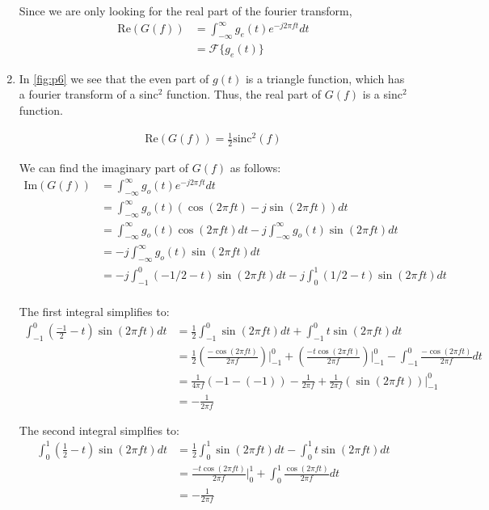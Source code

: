 \documentclass{article}
\begin{document}
\begin{enumerate}[label=6.\arabic*]
    Since we are only looking for the real part of the fourier transform,
    \begin{align*}
        \text{Re}(G(f)) &= \int_{-\infty}^{\infty} g_e(t)e^{-j2\pi ft} dt \\
        &= \mathcal{F}\{g_e(t)\}
    \end{align*}

    \item In \autoref{fig:p6} we see that the even part of $g(t)$ is a triangle function, which has a fourier transform of a sinc$^2$ function. Thus, the real part of $G(f)$ is a sinc$^2$ function.

    \begin{align*}
        \text{Re}(G(f)) = \frac{1}{2}\text{sinc}^2(f)
    \end{align*}

    We can find the imaginary part of $G(f)$ as follows:
    \begin{align*}
        \text{Im}(G(f)) &= \int_{-\infty}^{\infty} g_o(t)e^{-j2\pi ft} dt \\
        &= \int_{-\infty}^{\infty} g_o(t)(\cos(2\pi ft) - j\sin(2\pi ft)) dt \\
        &= \int_{-\infty}^{\infty} g_o(t)\cos(2\pi ft) dt - j\int_{-\infty}^{\infty} g_o(t)\sin(2\pi ft) dt \\
        &= -j \int_{-\infty}^{\infty} g_o(t)\sin(2\pi ft) dt \\
        &= -j \int_{-1}^{0}(-1/2 - t)\sin(2\pi ft) dt - j \int_{0}^{1}(1/2 - t)\sin(2\pi ft) dt \\
    \end{align*}

    The first integral simplifies to:
    \begin{align*}
        \int_{-1}^{0}\left(\frac{-1}{2} -t\right)\sin(2\pi f t) dt &= \frac{1}{2}\int_{-1}^{0}\sin(2\pi f t) dt + \int_{-1}^{0}t\sin(2\pi f t) dt \\
        &= \frac{1}{2}\left(\frac{-\cos(2\pi f t)}{2\pi f}\right)\Bigg|_{-1}^{0} + \left(\frac{-t\cos(2\pi f t)}{2\pi f}\right)\Bigg|_{-1}^{0} - \int_{-1}^{0}\frac{-\cos(2\pi f t)}{2\pi f} dt \\
        &= \frac{1}{4\pi f} \left(-1 - (-1)\right) - \frac{1}{2\pi f} + \frac{1}{2\pi f} \left(\sin(2\pi f t )\right)\Bigg|_{-1}^{0} \\
        &= -\frac{1}{2\pi f}
    \end{align*}

    The second integral simplfies to:
    \begin{align*}
        \int_{0}^{1}\left(\frac{1}{2} -t\right)\sin(2\pi f t) dt &= \frac{1}{2}\int_{0}^{1}\sin(2\pi f t) dt - \int_{0}^{1}t\sin(2\pi f t) dt \\
        &= \frac{-t \cos(2\pi f t)}{2\pi f} \Bigg|_{0}^{1} + \int_{0}^{1}\frac{\cos(2\pi f t)}{2\pi f} dt \\
        &= -\frac{1}{2\pi f}
    \end{align*}~


\end{enumerate}
\end{document}
